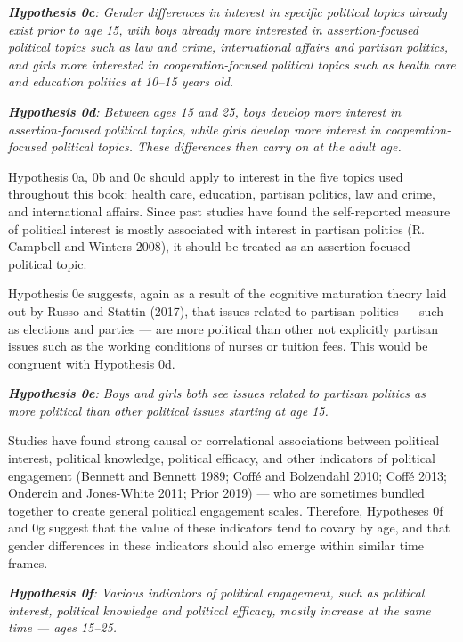 \documentclass[
  letterpaper,
  DIV=11,
  numbers=noendperiod]{scrreprt}
\begin{document}
\emph{\textbf{Hypothesis 0c}: Gender differences in interest in specific
political topics already exist prior to age 15, with boys already more
interested in assertion-focused political topics such as law and crime,
international affairs and partisan politics, and girls more interested
in cooperation-focused political topics such as health care and
education politics at 10--15 years old.}

\emph{\textbf{Hypothesis 0d}: Between ages 15 and 25, boys develop more
interest in assertion-focused political topics, while girls develop more
interest in cooperation-focused political topics. These differences then
carry on at the adult age.}

Hypothesis 0a, 0b and 0c should apply to interest in the five topics
used throughout this book: health care, education, partisan politics,
law and crime, and international affairs. Since past studies have found
the self-reported measure of political interest is mostly associated
with interest in partisan politics (R. Campbell and Winters 2008), it
should be treated as an assertion-focused political topic.

Hypothesis 0e suggests, again as a result of the cognitive maturation
theory laid out by Russo and Stattin (2017), that issues related to
partisan politics --- such as elections and parties --- are more
political than other not explicitly partisan issues such as the working
conditions of nurses or tuition fees. This would be congruent with
Hypothesis 0d.

\emph{\textbf{Hypothesis 0e}: Boys and girls both see issues related to
partisan politics as more political than other political issues starting
at age 15.}

Studies have found strong causal or correlational associations between
political interest, political knowledge, political efficacy, and other
indicators of political engagement (Bennett and Bennett 1989; Coffé and
Bolzendahl 2010; Coffé 2013; Ondercin and Jones-White 2011; Prior 2019)
--- who are sometimes bundled together to create general political
engagement scales. Therefore, Hypotheses 0f and 0g suggest that the
value of these indicators tend to covary by age, and that gender
differences in these indicators should also emerge within similar time
frames.

\emph{\textbf{Hypothesis 0f}: Various indicators of political
engagement, such as political interest, political knowledge and
political efficacy, mostly increase at the same time --- ages 15--25.}
\end{document}
